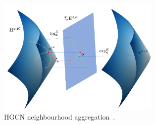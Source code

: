 \begin{figure}
  \centering
  \includegraphics[width=0.7\textwidth]{figs/arch.png}

   \caption{HGCN neighbourhood aggregation~\cite{chami2019HGCN}.}
  \label{fig:HGCNaggregation}
\end{figure}